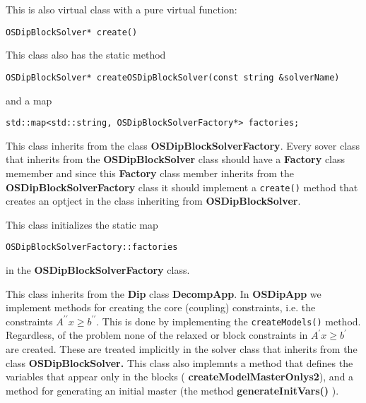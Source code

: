 \documentclass[11pt]{article}
\begin{document}
\vskip 8pt
  This is also virtual class with a pure
virtual function: 

\begin{verbatim}
OSDipBlockSolver* create()
\end{verbatim}

This class also has the static method

\begin{verbatim}
OSDipBlockSolver* createOSDipBlockSolver(const string &solverName)
\end{verbatim}

and a map

\begin{verbatim}
std::map<std::string, OSDipBlockSolverFactory*> factories;
\end{verbatim}


\vskip 8pt
  This class inherits from the class {\bf
OSDipBlockSolverFactory}. Every sover class that inherits from the  {\bf
OSDipBlockSolver} class should have a {\bf Factory} class memember and since
this {\bf Factory} class member inherits from the {\bf
OSDipBlockSolverFactory} class it should implement a {\tt create()} method that
creates an optject in the class inheriting from {\bf
OSDipBlockSolver}.

\vskip 8pt
  This class initializes the static map

\begin{verbatim}
OSDipBlockSolverFactory::factories
\end{verbatim}
in the {\bf OSDipBlockSolverFactory} class. 

\vskip 8pt
  This class inherits from the {\bf Dip} class {\bf
DecompApp}. In {\bf OSDipApp} we implement methods for creating the core
(coupling) constraints, i.e. the constraints $A^{\prime \prime} x \ge
b^{\prime \prime}$.  This is done by implementing the  {\tt createModels()}
method. Regardless, of the problem none of the relaxed or block constraints in $A^{\prime } x \ge
b^{\prime}$ are created. These are treated implicitly in the solver class that
inherits from the class {\bf OSDipBlockSolver.}  This class also implemnts a
method that defines the variables that appear only in the blocks ({\bf
createModelMasterOnlys2}), and a method for generating an initial master (the
method {\bf generateInitVars()  }). 
\end{document}
